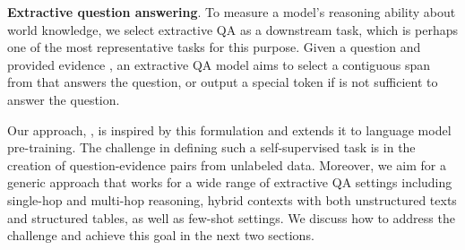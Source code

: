 \documentclass[11pt]{article}
\newcommand{\hs}[1]{\textcolor{blue}{Huan: #1}}
\newcommand{\nop}[1]{}
\newcommand{\ours}[0]{\text{ReasonBERT}}
\begin{document}
\noindent \textbf{Extractive question answering}. To measure a model’s reasoning ability about world knowledge, we select extractive QA as a downstream task, which is perhaps one of the most representative tasks for this purpose. Given a question  and provided evidence , an extractive QA model  aims to select a contiguous span  from  that answers the question, or output a special token if  is not sufficient to answer the question. 


Our approach, \ours, is inspired by this formulation and extends it to language model pre-training. The challenge in defining such a self-supervised task is in the creation of question-evidence pairs from unlabeled data. Moreover, we aim for a generic approach that works for a wide range of extractive QA settings including single-hop and multi-hop reasoning, hybrid contexts with both unstructured texts and structured tables, as well as few-shot settings. We discuss how to address the challenge and achieve this goal in the next two sections. 



\nop{
Earlier QA datasets like SQuAD mostly contain simple single-hop questions that use only a single context as evidence and do not require deep comprehension and reasoning. More recently, researchers have studied more challenging QA tasks, including multi-hop QA (where the model needs to first filter out irrelevant information from a set of contexts \hs{does our pre-training help this part?}, and then combine multiple disjoint pieces of evidence as  to find the answer) and hybrid QA (where the evidence  includes both unstructured text and structured tables). {These tasks require reasoning over multiple contexts and understanding long-range relations.} 

{Driven by this observation, we aim to improve such reasoning abilities during pre-training so that the pre-trained models can better serve these as well as other similar tasks. One essential challenge is creating a large set of query-evidence pairs for pre-training, which we will detail next.}
}
\end{document}
